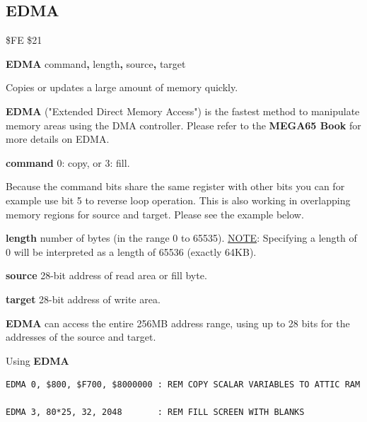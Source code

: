 \subsection{EDMA}
\label{BASIC 65 Commands!EDMA}
\begin{description}[leftmargin=2cm,style=nextline]
\item [Token:]    \$FE \$21

\item [Format:]   {\bf EDMA} command{\bf,} length{\bf,} source{\bf,} target

\item [Usage:]    Copies or updates a large amount of memory quickly.

                  {\bf EDMA} ("Extended Direct Memory Access") is the fastest method to manipulate memory areas using the DMA controller. Please refer to \ifdefined\printmanual
                     the {\bf MEGA65 Book}
                  \else
                  \fi
                  for more details on EDMA.

                  {\bf command} 0: copy, or 3: fill.

                  Because the command bits share the same register with other bits you can for example use bit 5 to reverse loop operation. This is also working in overlapping memory regions for source and target. Please see the example below.

                  {\bf length} number of bytes (in the range 0 to 65535). \underline{NOTE}: Specifying a length of 0 will be interpreted as a length of 65536 (exactly 64KB).

                  {\bf source} 28-bit address of read area or fill byte.

                  {\bf target} 28-bit address of write area.

\item [Remarks:]  {\bf EDMA} can access the entire 256MB address range, using up to 28 bits for the addresses of the source and target.

\item [Examples:] Using {\bf EDMA}

\begin{tcolorbox}[colback=black,coltext=white]
\verbatimfont{\codefont}
\begin{verbatim}
EDMA 0, $800, $F700, $8000000 : REM COPY SCALAR VARIABLES TO ATTIC RAM

EDMA 3, 80*25, 32, 2048       : REM FILL SCREEN WITH BLANKS


\end{verbatim}
\end{tcolorbox}
\end{description}
